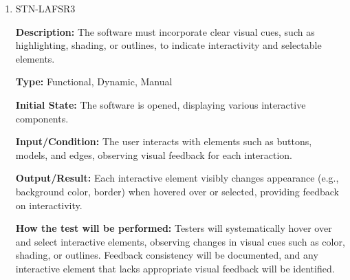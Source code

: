 \documentclass[12pt, titlepage]{article}
\begin{document}
\begin{enumerate}
\item{STN-LAFSR3\\}

\textbf{Description:} The software must incorporate clear visual cues, such as highlighting, shading, or outlines, to indicate interactivity and selectable elements.

\textbf{Type:} Functional, Dynamic, Manual

\textbf{Initial State:} The software is opened, displaying various interactive components.

\textbf{Input/Condition:} The user interacts with elements such as buttons, models, and edges, observing visual feedback for each interaction.

\textbf{Output/Result:} Each interactive element visibly changes appearance (e.g., background color, border) when hovered over or selected, providing feedback on interactivity.

\textbf{How the test will be performed:} Testers will systematically hover over and select interactive elements, observing changes in visual cues such as color, shading, or outlines. Feedback consistency will be documented, and any interactive element that lacks appropriate visual feedback will be identified.

\end{enumerate}
\end{document}
